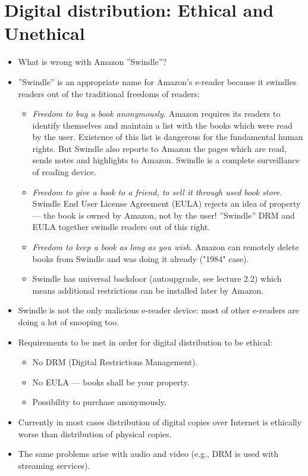 \documentclass[twoside,openright]{report}
\begin{document}
\section{Digital distribution: Ethical and Unethical}
\begin{itemize}
 \item     What is wrong with Amazon ''Swindle''?
 \item     ''Swindle'' is an appropriate name for Amazon's e-reader because it swindles readers out of the traditional freedoms of readers:
\begin{itemize}
 \item         \emph{Freedom to buy a book anonymously.} Amazon requires its readers to identify themselves and maintain a list with the books which were read by the user. Existence of this list is dangerous for the fundamental human rights. But Swindle also reports to Amazon the pages which are read, sends notes and highlights to Amazon. Swindle is a complete surveillance of reading device.
 \item         \emph{Freedom to give a book to a friend, to sell it through used book store.} Swindle End User License Agreement (EULA) rejects an idea of property --- the book is owned by Amazon, not by the user! ''Swindle'' DRM and EULA together swindle readers out of this right.
 \item         \emph{Freedom to keep a book as long as you wish.} Amazon can remotely delete books from Swindle and was doing it already ("1984" case).
 \item         Swindle has universal backdoor (autoupgrade, see lecture 2.2) which means additional restrictions can be installed later by Amazon.
\end{itemize}
 \item     Swindle is not the only malicious e-reader device: most of other e-readers are doing a lot of snooping too.
 \item     Requirements to be met in order for digital distribution to be ethical:
\begin{itemize}
 \item         No DRM (Digital Restrictions Management).
 \item         No EULA --- books shall be your property.
 \item         Possibility to purchase anonymously.
\end{itemize}
 \item     Currently in most cases distribution of digital copies over Internet is ethically worse than distribution of physical copies.
 \item     The same problems arise with audio and video (e.g., DRM is used with streaming services).
\end{itemize}
\end{document}
